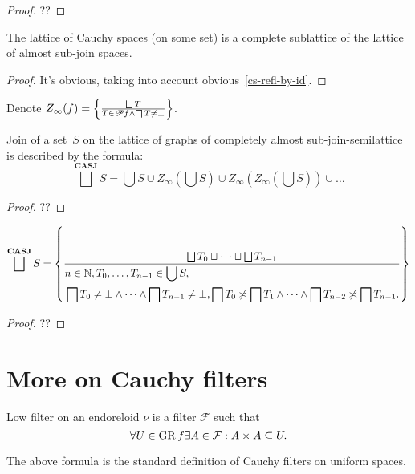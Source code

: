 \begin{proof}
??
\end{proof}

\begin{prop}
The lattice of Cauchy spaces (on some set) is a complete sublattice of the lattice of almost sub-join spaces.
\end{prop}

\begin{proof}
It's obvious, taking into account obvious~\ref{cs-refl-by-id}.
\end{proof}

Denote $Z_{\infty}(f)=\setcond{\bigsqcup T}{T\in\subsets f\land\bigsqcap T\ne\bot}$.

\begin{prop}
Join of a set~$S$ on the lattice of graphs of completely almost sub-join-semilattice is described by the formula:
\[
\bigsqcup^{\mathbf{CASJ}}S=\bigcup S \cup Z_{\infty}\left(\bigcup S\right) \cup Z_{\infty}\left(Z_{\infty}\left(\bigcup S\right)\right) \cup \dots
\]
\end{prop}

\begin{proof}
??
\end{proof}

\begin{prop}
\[
\bigsqcup^{\mathbf{CASJ}}S=
\setcond{\bigsqcup T_0\sqcup\dots\sqcup\bigsqcup T_{n-1}}{
\begin{aligned}
&n\in\mathbb{N},T_0,\dots,T_{n-1}\in\bigcup S, \\
&\bigsqcap T_0\ne\bot\land\dots\land\bigsqcap T_{n-1}\ne\bot,
\bigsqcap T_0\nasymp\bigsqcap T_1\land\dots\land\bigsqcap T_{n-2}\nasymp\bigsqcap T_{n-1}.
\end{aligned}}
\]
\end{prop}

\begin{proof}
??
\end{proof}

\section{More on Cauchy filters}

\begin{obvious}
Low filter on an endoreloid $\nu$ is a filter $\mathcal{F}$ such that
\[ \forall U \in \operatorname{GR} f \exists A \in \mathcal{F} : A \times A \subseteq
   U. \]
\end{obvious}

\begin{rem}
  The above formula is the standard definition of Cauchy filters on uniform
  spaces.
\end{rem}

